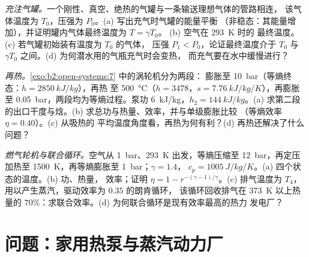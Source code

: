\begin{exercise}[$\star\star\star$]\label{exo:b2:open-systems:10}
\emph{充注气罐。}一个刚性、真空、绝热的气罐与一条输送理想气体的管路相连，
该气体温度为 $T_0$，压强为 $P_0$。(a) 写出充气时气罐的能量平衡
（非稳态：其能量增加），并证明罐内气体最终温度为 $T = \gamma T_0$。
(b) 空气在 \qty{293}{K} 时的
最终温度。(c) 若气罐初始装有温度为 $T_0$ 的气体，
压强 $P_1 < P_0$，论证最终温度介于 $T_0$ 与
$\gamma T_0$ 之间。(d) 为何潜水用的气瓶充气时会变热，
而充气要在水中缓慢进行？
\end{exercise}

\begin{exercise}[$\star\star\star$]\label{exo:b2:open-systems:11}
\emph{再热。}\cref{exo:b2:open-systems:7} 中的涡轮机分为两段：
膨胀至 \qty{10}{bar}（等熵终态：$h = \qty{2850}{kJ/kg}$），再热
至 \qty{500}{\celsius}（$h = 3478$，$s = \qty{7.76}{kJ/kg/K}$），再膨胀
至 \qty{0.05}{bar}，两段均为等熵过程。泵功 \qty{6}{kJ/kg}，$h_2 =
\qty{144}{kJ/kg}$。(a) 求第二段的出口干度与焓。(b)
求总功与热量、效率，并与单级膨胀比较
（等熵效率 $\eta = 0.40$）。(c) 从吸热的
平均温度角度看，再热为何有利？(d) 再热还解决了什么问题？
\end{exercise}

\begin{exercise}[$\star\star\star$]\label{exo:b2:open-systems:12}
\emph{燃气轮机与联合循环。}空气从
\qty{1}{bar}、\qty{293}{K} 出发，等熵压缩至 \qty{12}{bar}，再定压
加热至 \qty{1500}{K}，再等熵膨胀至 \qty{1}{bar}；$\gamma = 1.4$，
$c_p = \qty{1005}{J/kg/K}$。(a) 四个状态的温度。(b) 功、热量，
效率；证明 $\eta = 1 - r^{-(\gamma - 1)/\gamma}$。(c)
排气温度为 $T_4$，用以产生蒸汽，驱动效率为 $0.35$ 的朗肯循环，
该循环回收排气在 \qty{373}{K} 以上热量的 $70\%$：求联合效率。(d)
为何联合循环是现有效率最高的热力
发电厂？
\end{exercise}

\section{问题：家用热泵与蒸汽动力厂}

